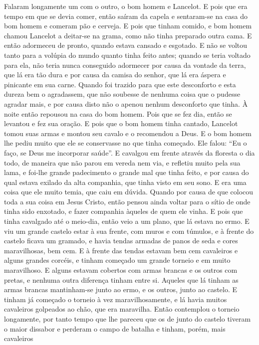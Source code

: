 Falaram longamente um com o outro, o bom homem e Lancelot. E pois que era tempo
em que se devia comer, então saíram da capela e sentaram-se na casa do bom
homem e comeram pão e cerveja. E pois que tinham comido, e bom homem
chamou Lancelot a deitar-se na grama, como não tinha preparado outra cama. E
então adormeceu de pronto, quando estava cansado e esgotado. E não se voltou
tanto para a volúpia do mundo quanto tinha feito antes; quando se teria voltado
para ela, não teria nunca conseguido adormecer por causa da vontade da terra,
que lá era tão dura e por causa da camisa do senhor, que lá era áspera e
pinicante em sua carne. Quando foi trazido para que este desconforto e esta
dureza bem o agradassem, que não soubesse de nenhuma coisa que o pudesse
agradar mais, e por causa disto não o apenou nenhum desconforto que tinha. À 
noite então repousou na casa do bom homem. Pois que se fez dia, então se
levantou e fez sua oração. E pois que o bom homem tinha cantado, Lancelot
tomou suas armas e montou seu cavalo e o recomendou a Deus. E o bom homem lhe
pediu muito que ele se conservasse no que tinha começado. Ele falou: “Eu o
faço, se Deus me incorporar saúde”. E cavalgou em frente através da floresta o
dia todo, de maneira que não parou em vereda nem via, e refletiu muito pela sua
lama, e foi-lhe grande padecimento o grande mal que tinha feito, e por causa do
qual estava exilado da alta companhia, que tinha visto em seu sono. E era uma
coisa que ele muito temia, que caiu em dúvida. Quando por causa de que colocou
toda a sua coisa em Jesus Cristo, então pensou ainda voltar para o sítio de
onde tinha sido enxotado, e fazer companhia àqueles de quem ele vinha. E pois
que tinha cavalgado até o meio-dia, então veio a um plano, que lá estava no
ermo. E viu um grande castelo estar à sua frente, com muros e com túmulos, e à
frente do castelo ficava um gramado, e havia tendas armadas de panos de seda e
cores maravilhosas, bem cem. E à frente das tendas estavam bem cem cavaleiros e
alguns grandes corcéis, e tinham começado um grande torneio e em muito
maravilhoso. E alguns estavam cobertos com armas brancas e os outros com
pretas, e nenhuma outra diferença tinham entre si. Aqueles que lá tinham as
armas brancas mantinham-se junto ao ermo, e os outros, junto ao castelo. E
tinham já começado o torneio à vez maravilhosamente, e lá havia muitos
cavaleiros golpeados ao chão, que era maravilha. Então contemplou o torneio
longamente, por tanto tempo que lhe pareceu que os de junto do castelo tiveram
o maior dissabor e perderam o campo de batalha e tinham, porém, mais cavaleiros
